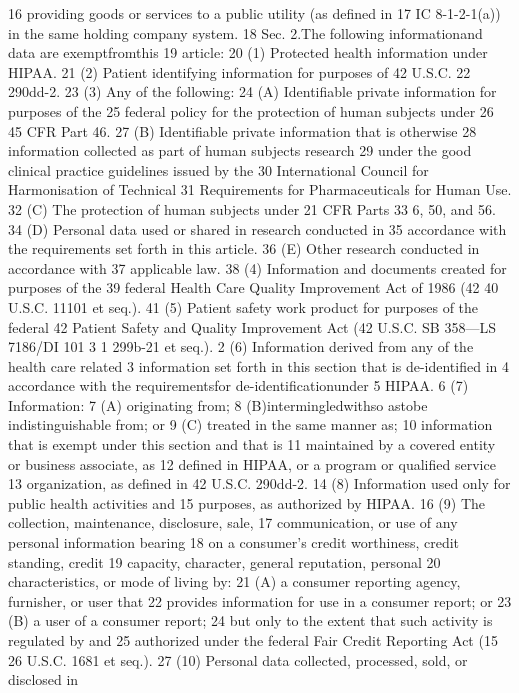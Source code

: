16 providing goods or services to a public utility (as defined in
17 IC 8-1-2-1(a)) in the same holding company system.
18 Sec. 2.The following informationand data are exemptfromthis
19 article:
20 (1) Protected health information under HIPAA.
21 (2) Patient identifying information for purposes of 42 U.S.C.
22 290dd-2.
23 (3) Any of the following:
24 (A) Identifiable private information for purposes of the
25 federal policy for the protection of human subjects under
26 45 CFR Part 46.
27 (B) Identifiable private information that is otherwise
28 information collected as part of human subjects research
29 under the good clinical practice guidelines issued by the
30 International Council for Harmonisation of Technical
31 Requirements for Pharmaceuticals for Human Use.
32 (C) The protection of human subjects under 21 CFR Parts
33 6, 50, and 56.
34 (D) Personal data used or shared in research conducted in
35 accordance with the requirements set forth in this article.
36 (E) Other research conducted in accordance with
37 applicable law.
38 (4) Information and documents created for purposes of the
39 federal Health Care Quality Improvement Act of 1986 (42
40 U.S.C. 11101 et seq.).
41 (5) Patient safety work product for purposes of the federal
42 Patient Safety and Quality Improvement Act (42 U.S.C.
SB 358—LS 7186/DI 101
3
1 299b-21 et seq.).
2 (6) Information derived from any of the health care related
3 information set forth in this section that is de-identified in
4 accordance with the requirementsfor de-identificationunder
5 HIPAA.
6 (7) Information:
7 (A) originating from;
8 (B)intermingledwithso astobe indistinguishable from; or
9 (C) treated in the same manner as;
10 information that is exempt under this section and that is
11 maintained by a covered entity or business associate, as
12 defined in HIPAA, or a program or qualified service
13 organization, as defined in 42 U.S.C. 290dd-2.
14 (8) Information used only for public health activities and
15 purposes, as authorized by HIPAA.
16 (9) The collection, maintenance, disclosure, sale,
17 communication, or use of any personal information bearing
18 on a consumer's credit worthiness, credit standing, credit
19 capacity, character, general reputation, personal
20 characteristics, or mode of living by:
21 (A) a consumer reporting agency, furnisher, or user that
22 provides information for use in a consumer report; or
23 (B) a user of a consumer report;
24 but only to the extent that such activity is regulated by and
25 authorized under the federal Fair Credit Reporting Act (15
26 U.S.C. 1681 et seq.).
27 (10) Personal data collected, processed, sold, or disclosed in
